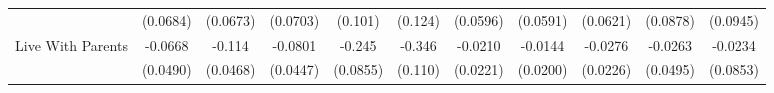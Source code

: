 {\begin{tabular}{l*{10}{c}}
            &    (0.0684)         &    (0.0673)         &    (0.0703)         &     (0.101)         &     (0.124)         &    (0.0596)         &    (0.0591)         &    (0.0621)         &    (0.0878)         &    (0.0945)         \\
\addlinespace
Live With Parents&     -0.0668         &      -0.114\sym{*}  &     -0.0801         &      -0.245\sym{**} &      -0.346\sym{**} &     -0.0210         &     -0.0144         &     -0.0276         &     -0.0263         &     -0.0234         \\
            &    (0.0490)         &    (0.0468)         &    (0.0447)         &    (0.0855)         &     (0.110)         &    (0.0221)         &    (0.0200)         &    (0.0226)         &    (0.0495)         &    (0.0853)         \\
\bottomrule
\end{tabular}
}
